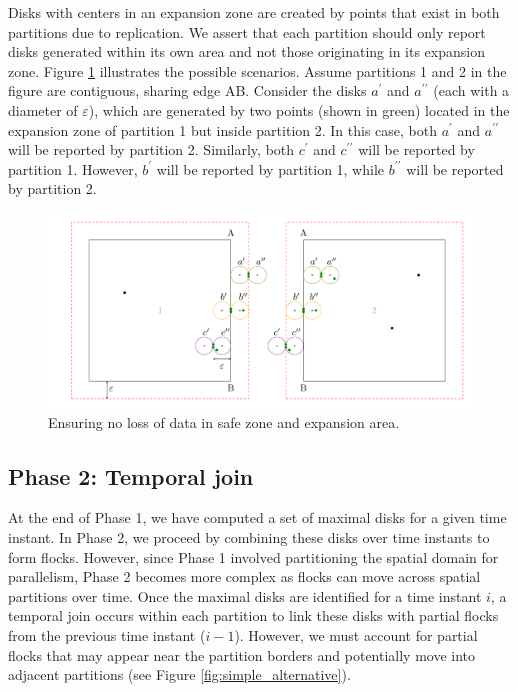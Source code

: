 Disks with centers in an expansion zone are created by points that exist in both partitions due to replication. We assert that each partition should only report disks generated within its own area and not those originating in its expansion zone. Figure \ref{fig:ensuring} illustrates the possible scenarios. Assume partitions 1 and 2 in the figure are contiguous, sharing edge AB. Consider the disks $a^\prime$ and $a^{\prime\prime}$ (each with a diameter of $\varepsilon$), which are generated by two points (shown in green) located in the expansion zone of partition 1 but inside partition 2. In this case, both $a^\prime$ and $a^{\prime\prime}$ will be reported by partition 2. Similarly, both $c^\prime$ and $c^{\prime\prime}$ will be reported by partition 1. However, $b^\prime$ will be reported by partition 1, while $b^{\prime\prime}$ will be reported by partition 2.

\begin{figure}
    \centering
    \includegraphics[width=\linewidth]
    {chapter4/figures/merge.pdf}
    \caption{Ensuring no loss of data in safe zone and expansion area.}\label{fig:ensuring}
\end{figure}

\subsection{Phase 2: Temporal join}\label{sec:temporal_join}
At the end of Phase 1, we have computed a set of maximal disks for a given time instant. In Phase 2, we proceed by combining these disks over time instants to form flocks. However, since Phase 1 involved partitioning the spatial domain for parallelism, Phase 2 becomes more complex as flocks can move across spatial partitions over time. Once the maximal disks are identified for a time instant $i$, a temporal join occurs within each partition to link these disks with partial flocks from the previous time instant ($i-1$). However, we must account for partial flocks that may appear near the partition borders and potentially move into adjacent partitions (see Figure \ref{fig:simple_alternative}).

